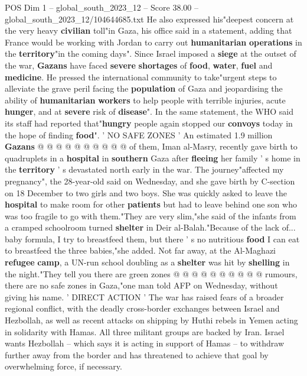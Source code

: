 \begin{textsample}{POS Dim 1 – global\_south\_2023\_12 – Score 38.00 – global\_south\_2023\_12/104644685.txt}
He also expressed his"deepest concern at the very heavy \textbf{civilian} toll"in Gaza, his office said in a statement, adding that France would be working with Jordan to carry out \textbf{humanitarian} \textbf{operations} in the \textbf{territory}"in the coming days".
Since Israel imposed a \textbf{siege} at the outset of the war, \textbf{Gazans} have faced \textbf{severe} \textbf{shortages} of \textbf{food}, \textbf{water}, \textbf{fuel} and \textbf{medicine}.
He pressed the international community to take"urgent steps to alleviate the grave peril facing the \textbf{population} of Gaza and jeopardising the ability of \textbf{humanitarian} \textbf{workers} to help people with terrible injuries, acute \textbf{hunger}, and at \textbf{severe} risk of \textbf{disease}".
In the same statement, the WHO said its staff had reported that"\textbf{hungry} people again stopped our \textbf{convoys} today in the hope of finding \textbf{food}". ' NO SAFE ZONES ' An estimated 1.9 million \textbf{Gazans} @ @ @ @ @ @ @ @ @ @ of them, Iman al-Masry, recently gave birth to quadruplets in a \textbf{hospital} in \textbf{southern} Gaza after \textbf{fleeing} her family ' s home in the \textbf{territory} ' s devastated north early in the war.
The journey"affected my pregnancy", the 28-year-old said on Wednesday, and she gave birth by C-section on 18 December to two girls and two boys.
She was quickly asked to leave the \textbf{hospital} to make room for other \textbf{patients} but had to leave behind one son who was too fragile to go with them."They are very slim,"she said of the infants from a cramped schoolroom turned \textbf{shelter} in Deir al-Balah."Because of the lack of... baby formula, I try to breastfeed them, but there ' s no nutritious \textbf{food} I can eat to breastfeed the three babies,"she added.
Not far away, at the Al-Maghazi \textbf{refugee} \textbf{camp}, a UN-run school doubling as a \textbf{shelter} was hit by \textbf{shelling} in the night."They tell you there are green zones @ @ @ @ @ @ @ @ @ @ rumours, there are no safe zones in Gaza,"one man told AFP on Wednesday, without giving his name. ' DIRECT ACTION ' The war has raised fears of a broader regional conflict, with the deadly cross-border exchanges between Israel and Hezbollah, as well as recent attacks on shipping by Huthi rebels in Yemen acting in solidarity with Hamas.
All three militant groups are backed by Iran.
Israel wants Hezbollah -- which says it is acting in support of Hamas -- to withdraw further away from the border and has threatened to achieve that goal by overwhelming force, if necessary.

\end{textsample}
